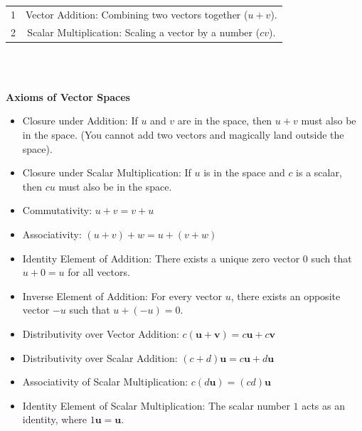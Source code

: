 \documentclass[DIV=20,oneside]{scrartcl}
\begin{document}
\begin{tabular}{cc}
	1 & Vector Addition: Combining two vectors together (${u} + {v}$). \\
	2 & Scalar Multiplication: Scaling a vector by a number ($c{v}$).
\end{tabular}
\,\\\,
\par
\textbf{Axioms of Vector Spaces}
\begin{itemize}
	\item Closure under Addition: If ${u}$ and ${v}$ are in the space, then ${u} + {v}$ must also be in the space. (You cannot add two vectors and magically land outside the space).
	\item Closure under Scalar Multiplication: If ${u}$ is in the space and $c$ is a scalar, then $c{u}$ must also be in the space.
	\item Commutativity: ${u} + {v} = {v} + {u}$
	\item Associativity: $({u} + {v}) + {w} = {u} + ({v} + {w})$
	\item Identity Element of Addition: There exists a unique zero vector ${0}$ such that ${u} + {0} = {u}$ for all vectors.
	\item Inverse Element of Addition: For every vector ${u}$, there exists an opposite vector $-{u}$ such that ${u} + (-{u}) = {0}$.
	\item Distributivity over Vector Addition: $c(\mathbf{u} + \mathbf{v}) = c\mathbf{u} + c\mathbf{v}$
	\item Distributivity over Scalar Addition: $(c + d)\mathbf{u} = c\mathbf{u} + d\mathbf{u}$
	\item Associativity of Scalar Multiplication: $c(d\mathbf{u}) = (cd)\mathbf{u}$
	\item Identity Element of Scalar Multiplication: The scalar number $1$ acts as an identity, where $1\mathbf{u} = \mathbf{u}$.
\end{itemize}
\end{document}
